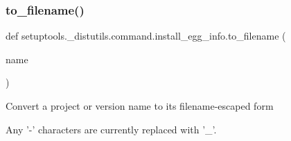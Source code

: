 \subsubsection{\texorpdfstring{to\+\_\+filename()}{to\_filename()}}
{\footnotesize\ttfamily def setuptools.\+\_\+distutils.\+command.\+install\+\_\+egg\+\_\+info.\+to\+\_\+filename (\begin{DoxyParamCaption}\item[{}]{name }\end{DoxyParamCaption})}

\begin{DoxyVerb}Convert a project or version name to its filename-escaped form

Any '-' characters are currently replaced with '_'.
\end{DoxyVerb}
 